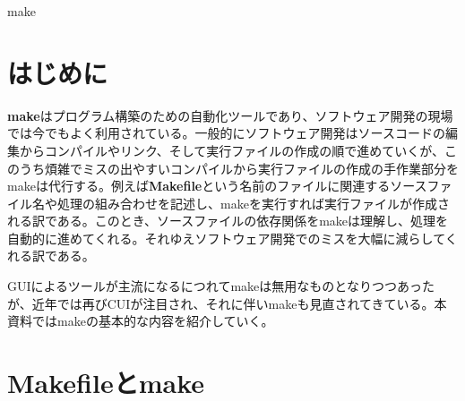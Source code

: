 \documentclass[dvipdfmx, 9pt, a4paper]{jsarticle}
\numberwithin{equation}{section}
\begin{document}
\begin{center}
{\fontsize{18pt}{1pt}\selectfont make}\\
\end{center}

\section*{はじめに}
{\bf make}はプログラム構築のための自動化ツールであり、ソフトウェア開発の現場では今でもよく利用されている。一般的にソフトウェア開発はソースコードの編集からコンパイルやリンク、そして実行ファイルの作成の順で進めていくが、このうち煩雑でミスの出やすいコンパイルから実行ファイルの作成の手作業部分をmakeは代行する。例えば{\bf Makefile}という名前のファイルに関連するソースファイル名や処理の組み合わせを記述し、makeを実行すれば実行ファイルが作成される訳である。このとき、ソースファイルの依存関係をmakeは理解し、処理を自動的に進めてくれる。それゆえソフトウェア開発でのミスを大幅に減らしてくれる訳である。\par
GUIによるツールが主流になるにつれてmakeは無用なものとなりつつあったが、近年では再びCUIが注目され、それに伴いmakeも見直されてきている。本資料ではmakeの基本的な内容を紹介していく。
\section{Makefileとmake}
\end{document}
